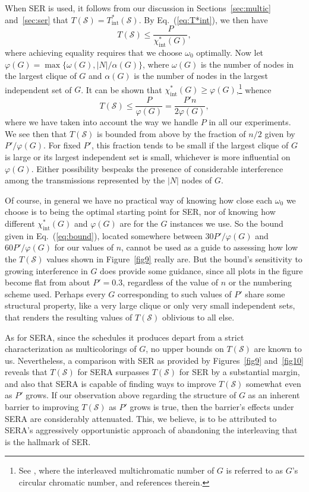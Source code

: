 \documentclass{article}
\begin{document}
When SER is used, it follows from our discussion in Sections~\ref{sec:multic}
and~\ref{sec:ser} that $T(\mathcal{S})=T^*_\mathrm{int}(\mathcal{S})$. By
Eq.~(\ref{eq:T*int}), we then have
\begin{equation}
T(\mathcal{S})\le\frac{P}{\chi^*_\mathrm{int}(G)},
\end{equation}
where achieving equality requires that we choose $\omega_0$ optimally. Now let
$\varphi(G)=\max\{\omega(G),\vert N\vert/\alpha(G)\}$, where $\omega(G)$ is the
number of nodes in the largest clique of $G$ and $\alpha(G)$ is the number of
nodes in the largest independent set of $G$. It can be shown that
$\chi^*_\mathrm{int}(G)\ge\varphi(G)$,\footnote{See \cite{l03}, where the
interleaved multichromatic number of $G$ is referred to as $G$'s circular
chromatic number, and references therein.} whence
\begin{equation}
T(\mathcal{S})\le\frac{P}{\varphi(G)}=\frac{P'n}{2\varphi(G)},
\label{eq:bound}
\end{equation}
where we have taken into account the way we handle $P$ in all our experiments.
We see then that $T(\mathcal{S})$ is bounded from above by the fraction of
$n/2$ given by $P'/\varphi(G)$. For fixed $P'$, this fraction tends to be
small if the largest clique of $G$ is large or its largest independent set is
small, whichever is more influential on $\varphi(G)$. Either possibility
bespeaks the presence of considerable interference among the transmissions
represented by the $\vert N\vert$ nodes of $G$.

Of course, in general we have no practical way of knowing how close each
$\omega_0$ we choose is to being the optimal starting point for SER, nor of
knowing how different $\chi^*_\mathrm{int}(G)$ and $\varphi(G)$ are for the $G$
instances we use. So the bound given in Eq.~(\ref{eq:bound}), located somewhere
between $30P'/\varphi(G)$ and $60P'/\varphi(G)$ for our values of $n$,
cannot be used as a guide to assessing how low the $T(\mathcal{S})$ values
shown in Figure~\ref{fig9} really are. But the bound's sensitivity to growing
interference in $G$ does provide some guidance, since all plots in the figure
become flat from about $P'=0.3$, regardless of the value of $n$ or the numbering
scheme used. Perhaps every $G$ corresponding to such values of $P'$ share some
structural property, like a very large clique or only very small independent
sets, that renders the resulting values of $T(\mathcal{S})$ oblivious to all
else.

As for SERA, since the schedules it produces depart from a strict
characterization as multicolorings of $G$, no upper bounds on $T(\mathcal{S})$
are known to us. Nevertheless, a comparison with SER as provided by
Figures~\ref{fig9} and~\ref{fig10} reveals that $T(\mathcal{S})$ for SERA
surpasses $T(\mathcal{S})$ for SER by a substantial margin, and also that SERA
is capable of finding ways to improve $T(\mathcal{S})$ somewhat even as $P'$
grows. If our observation above regarding the structure of $G$ as an inherent
barrier to improving $T(\mathcal{S})$ as $P'$ grows is true, then the barrier's
effects under SERA are considerably attenuated. This, we believe, is to be
attributed to SERA's aggressively opportunistic approach of abandoning the
interleaving that is the hallmark of SER.
\end{document}
